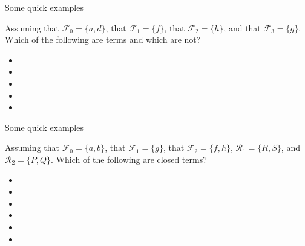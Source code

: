 \documentclass[aspectratio=169]{beamer}
\begin{document}
\begin{slide}{Some quick examples}

Assuming that $\mathcal{F}_0 = \{a,d\}$, that $\mathcal{F}_1 = \{f\}$, that $\mathcal{F}_2 = \{h\}$, and that $\mathcal{F}_3 = \{g\}$. Which of the following are terms and which are not?

\begin{itemize}
\item {}
\item {}
\item {}
\item {}
\item {}
\end{itemize}

\end{slide}

\begin{slide}{Some quick examples}

Assuming that $\mathcal{F}_0 = \{a,b\}$, that $\mathcal{F}_1 = \{g\}$, that $\mathcal{F}_2 = \{f,h\}$, $\mathcal{R}_1 = \{R,S\}$, and $\mathcal{R}_2 = \{P,Q\}$. Which of the following are closed terms?

\begin{itemize}
\item {}
\item {}
\item {}
\item {}
\item {}
\item {}
\end{itemize}

\end{slide}
\end{document}
